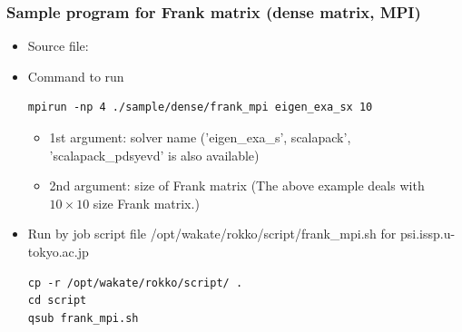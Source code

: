 \begin{frame}[c,fragile]
  \frametitle{Sample program for Frank matrix (dense matrix, MPI)}

  \begin{itemize}
    \item Source file: 
    \item Command to run
\begin{lstlisting}[style=shstyle]
mpirun -np 4 ./sample/dense/frank_mpi eigen_exa_sx 10
\end{lstlisting}
    \begin{itemize}
    \item 1st argument: solver name ('eigen_exa_s', scalapack', 'scalapack_pdsyevd' is also available) \\
    \item 2nd argument: size of Frank matrix (The above example deals with $10\times 10$ size Frank matrix.)
    \end{itemize}
  \item Run by job script file /opt/wakate/rokko/script/frank_mpi.sh for psi.issp.u-tokyo.ac.jp
\begin{lstlisting}[style=shstyle]
cp -r /opt/wakate/rokko/script/ .
cd script
qsub frank_mpi.sh
\end{lstlisting}
  \end{itemize}
\end{frame}

\lstset{escapechar=\#}


